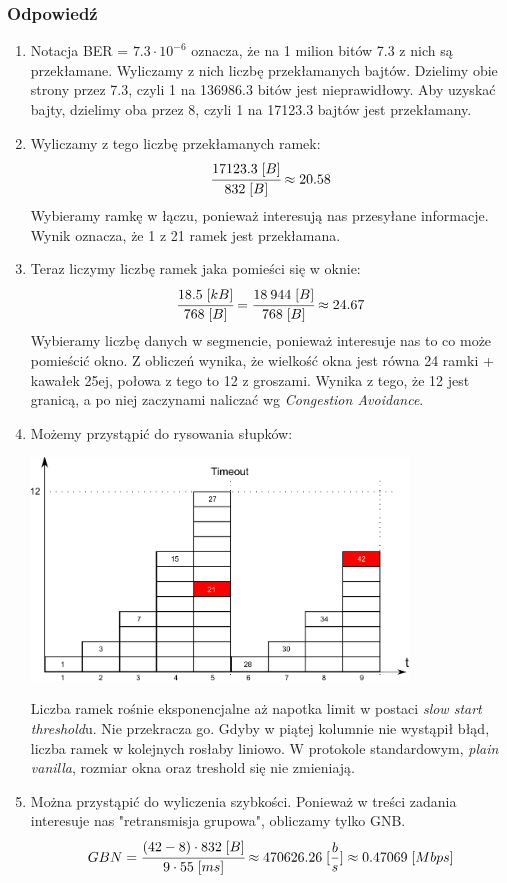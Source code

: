 \documentclass[a4paper,twoside]{article}
\begin{document}
	\subsubsection*{Odpowiedź}
	\begin{enumerate}
		\item Notacja BER = $ 7.3 \cdot 10 ^ {-6} $ oznacza, że na 1 milion bitów 7.3 z nich są przekłamane. Wyliczamy z nich liczbę przekłamanych bajtów. Dzielimy obie strony przez 7.3, czyli 1 na 136986.3 bitów jest nieprawidłowy. Aby uzyskać bajty, dzielimy oba przez 8, czyli 1 na 17123.3 bajtów jest przekłamany.
		\item Wyliczamy z tego liczbę przekłamanych ramek:
		$$ \cfrac{17123.3\;[B]}{832\;[B]}\approx20.58 $$
		Wybieramy ramkę w łączu, ponieważ interesują nas przesyłane informacje. Wynik oznacza, że 1 z 21 ramek jest przekłamana.
		\item Teraz liczymy liczbę ramek jaka pomieści się w oknie:
		$$ \cfrac{18.5\;[kB]}{768\;[B]}=\cfrac{18\:944\;[B]}{768\;[B]}\approx24.67 $$
		Wybieramy liczbę danych w segmencie, ponieważ interesuje nas to co może pomieścić okno. Z obliczeń wynika, że wielkość okna jest równa 24 ramki + kawałek 25ej, połowa z tego to 12 z groszami. Wynika z tego, że 12 jest granicą, a po niej zaczynami naliczać wg \emph{Congestion Avoidance}.
		\item Możemy przystąpić do rysowania słupków:
		\begin{center}
			\includegraphics[width=10.0cm]{./images/zadanie16}
		\end{center}
		Liczba ramek rośnie eksponencjalne aż napotka limit w postaci \emph{slow start threshold}u. Nie przekracza go. Gdyby w piątej kolumnie nie wystąpił błąd, liczba ramek w kolejnych rosłaby liniowo. W protokole standardowym, \emph{plain vanilla}, rozmiar okna oraz treshold się nie zmieniają.
		\item Można przystąpić do wyliczenia szybkości. Ponieważ w treści zadania interesuje nas "retransmisja grupowa", obliczamy tylko GNB.
		$$ GBN=\cfrac{(42-8)\cdot832\;[B]}{9\cdot55\;[ms]}\approx470626.26\;[\frac{b}{s}]\approx0.47069\;[Mbps]   $$
		
	\end{enumerate}
	
	
\end{document}
